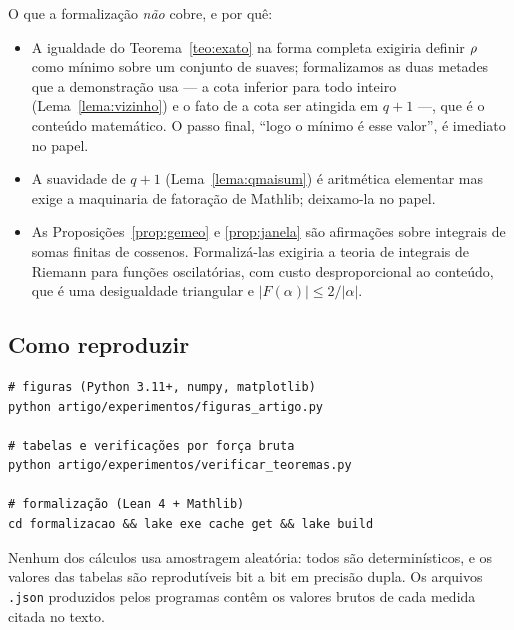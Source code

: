 O que a formalização \emph{não} cobre, e por quê:

\begin{itemize}[leftmargin=1.4em,itemsep=2pt]
\item A igualdade do Teorema~\ref{teo:exato} na forma completa exigiria definir
$\rho$ como mínimo sobre um conjunto de suaves; formalizamos as duas metades que a
demonstração usa — a cota inferior para todo inteiro (Lema~\ref{lema:vizinho}) e o
fato de a cota ser atingida em $q+1$ —, que é o conteúdo matemático. O passo
final, ``logo o mínimo é esse valor'', é imediato no papel.
\item A suavidade de $q+1$ (Lema~\ref{lema:qmaisum}) é aritmética elementar mas
exige a maquinaria de fatoração de Mathlib; deixamo-la no papel.
\item As Proposições~\ref{prop:gemeo} e \ref{prop:janela} são afirmações sobre
integrais de somas finitas de cossenos. Formalizá-las exigiria a teoria de
integrais de Riemann para funções oscilatórias, com custo desproporcional ao
conteúdo, que é uma desigualdade triangular e $|F(\alpha)|\le2/|\alpha|$.
\end{itemize}

\subsection{Como reproduzir}

\begin{center}
\begin{minipage}{0.95\textwidth}
\footnotesize
\begin{verbatim}
# figuras (Python 3.11+, numpy, matplotlib)
python artigo/experimentos/figuras_artigo.py

# tabelas e verificações por força bruta
python artigo/experimentos/verificar_teoremas.py

# formalização (Lean 4 + Mathlib)
cd formalizacao && lake exe cache get && lake build
\end{verbatim}
\end{minipage}
\end{center}

Nenhum dos cálculos usa amostragem aleatória: todos são determinísticos, e os
valores das tabelas são reprodutíveis bit a bit em precisão dupla. Os arquivos
\texttt{.json} produzidos pelos programas contêm os valores brutos de cada medida
citada no texto.

